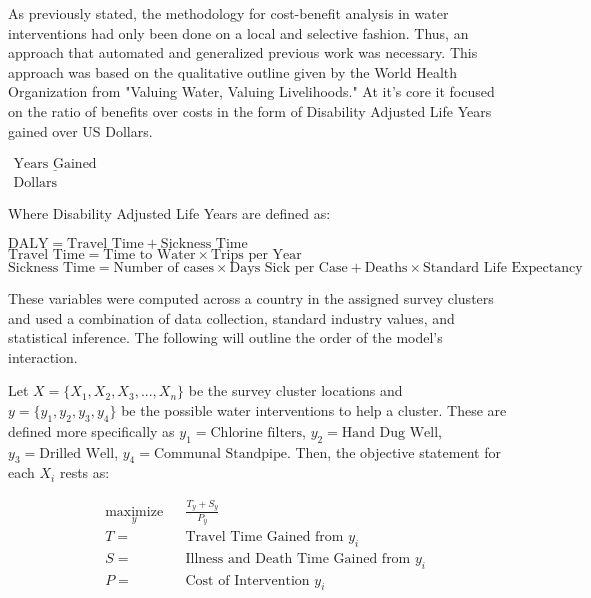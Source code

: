 As previously stated, the methodology for cost-benefit analysis in water interventions had only been done on a local and selective fashion.
Thus, an approach that automated and generalized previous work was necessary.
This approach was based on the qualitative outline given by the World Health Organization from "Valuing Water, Valuing Livelihoods."
At it's core it focused on the ratio of benefits over costs in the form of Disability Adjusted Life Years gained over US Dollars.
\\
\begin{center}
$\begin{matrix} \underline{\text{Years Gained}} \\ \text{Dollars} \end{matrix}$
\end{center}

Where Disability Adjusted Life Years are defined as:

\begin{center}
$\text{DALY} = \text{Travel Time} + \text{Sickness Time}$
\\
$\text{Travel Time} = \text{Time to Water} \times \text{Trips per Year}$
\\
$\text{Sickness Time} = \text{Number of cases} \times \text{Days Sick per Case} + \text{Deaths} \times \text{Standard Life Expectancy}$
\end{center}

These variables were computed across a country in the assigned survey clusters and used a combination of data collection, standard industry values, and statistical inference.
The following will outline the order of the model's interaction.

Let $X = \{X_1,X_2,X_3,...,X_n\}$ be the survey cluster locations and $y = \{y_1,y_2,y_3,y_4\}$ be the possible water interventions to help a cluster.
These are defined more specifically as $y_1 = \text{Chlorine filters}$, $y_2 = \text{Hand Dug Well}$, $y_3 = \text{Drilled Well}$, $y_4 = \text{Communal Standpipe}$.
Then, the objective statement for each $X_i$ rests as: %

\begin{center}
\begin{equation}
\begin{aligned}
& \underset{y}{\text{maximize}}
& & \frac{T_y + S_y}{P_y}  \\
& T =
& & \text{Travel Time Gained from } y_i \\
& S =
& & \text{Illness and Death Time Gained from } y_i \\
& P =
& & \text{Cost of Intervention } y_i \\
\end{aligned}
\end{equation}
\end{center}


